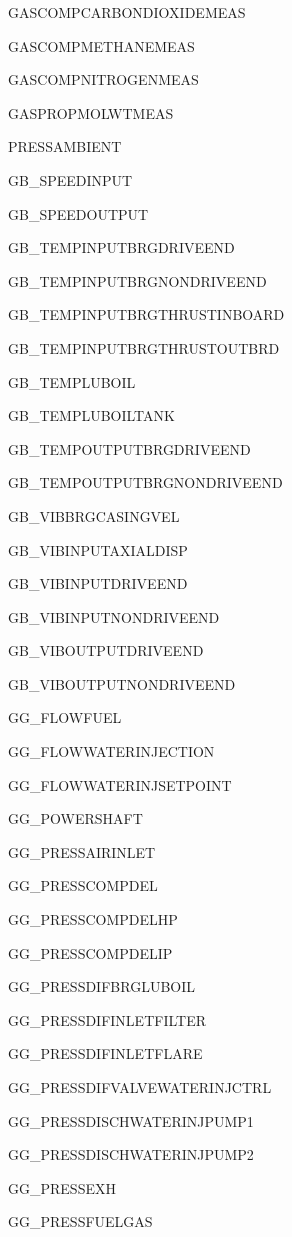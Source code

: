 \documentclass[11pt]{article} %
\theoremstyle{plain}
\theoremstyle{definition}
\begin{document}
\begin{appendices}
\begin{multicols}{2}
	\begin{enumerate}
		\scriptsize{
\item GASCOMPCARBONDIOXIDEMEAS
\item GASCOMPMETHANEMEAS
\item GASCOMPNITROGENMEAS
\item GASPROPMOLWTMEAS
\item PRESSAMBIENT
\item GB\_SPEEDINPUT
\item GB\_SPEEDOUTPUT
\item GB\_TEMPINPUTBRGDRIVEEND
\item GB\_TEMPINPUTBRGNONDRIVEEND
\item GB\_TEMPINPUTBRGTHRUSTINBOARD
\item GB\_TEMPINPUTBRGTHRUSTOUTBRD
\item GB\_TEMPLUBOIL
\item GB\_TEMPLUBOILTANK
\item GB\_TEMPOUTPUTBRGDRIVEEND
\item GB\_TEMPOUTPUTBRGNONDRIVEEND
\item GB\_VIBBRGCASINGVEL
\item GB\_VIBINPUTAXIALDISP
\item GB\_VIBINPUTDRIVEEND
\item GB\_VIBINPUTNONDRIVEEND
\item GB\_VIBOUTPUTDRIVEEND
\item GB\_VIBOUTPUTNONDRIVEEND
\item GG\_FLOWFUEL
\item GG\_FLOWWATERINJECTION
\item GG\_FLOWWATERINJSETPOINT
\item GG\_POWERSHAFT
\item GG\_PRESSAIRINLET
\item GG\_PRESSCOMPDEL
\item GG\_PRESSCOMPDELHP
\item GG\_PRESSCOMPDELIP
\item GG\_PRESSDIFBRGLUBOIL
\item GG\_PRESSDIFINLETFILTER
\item GG\_PRESSDIFINLETFLARE
\item GG\_PRESSDIFVALVEWATERINJCTRL
\item GG\_PRESSDISCHWATERINJPUMP1
\item GG\_PRESSDISCHWATERINJPUMP2
\item GG\_PRESSEXH
\item GG\_PRESSFUELGAS
}
\end{enumerate}
\end{multicols}
\end{appendices}
\end{document}
